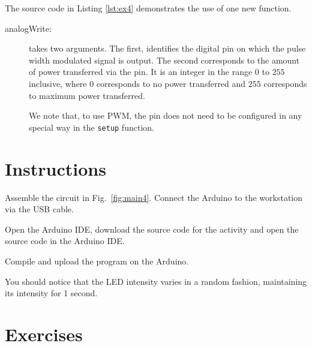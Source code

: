 \documentclass[12pt]{book}
\begin{document}
The source code in Listing \ref*{lst:ex4} demonstrates the use of one
new function.
\begin{description}
\item[analogWrite:] takes two arguments. The first, identifies the
  digital pin on which the pulse width modulated signal is output. The
  second corresponds to the amount of power transferred via the
  pin. It is an integer in the range $0$ to $255$ inclusive,
  where $0$ corresponds to no power transferred and $255$ corresponds
  to maximum power transferred. 

  We note that, to use PWM, the pin does not need to be configured in
  any special way in the \lstinline$setup$ function.
\end{description}




\section{Instructions}

\begin{compactitem}[--]
\item Assemble the circuit in Fig.~\ref*{fig:main4}. Connect the
  Arduino to the workstation via the USB cable.
\item Open the Arduino IDE, download the source code for the activity
  and open the source code in the Arduino IDE.
\item Compile and upload the program on the Arduino.
\item You should notice that the LED intensity varies in a random
  fashion, maintaining its intensity for 1 second.
\end{compactitem}

\section{Exercises}
\end{document}
